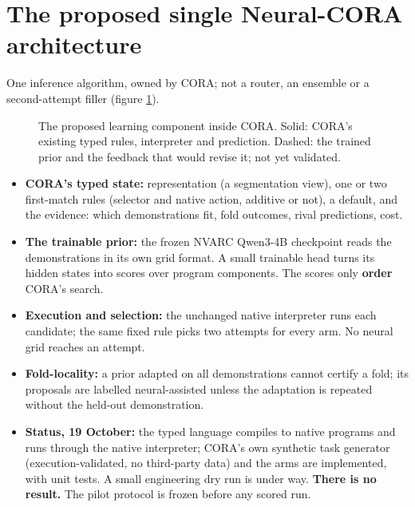 \documentclass[11pt, a4paper]{article}
\begin{document}
\section{The proposed single Neural-CORA architecture}
\label{sec-neural}
One inference algorithm, owned by CORA; not a router, an ensemble or a second-attempt filler (figure \ref{fig:neural}).

\begin{figure}[H]
\centering
{}
\caption{\label{fig:neural}The proposed learning component inside CORA. Solid: CORA's existing typed rules, interpreter and prediction. Dashed: the trained prior and the feedback that would revise it; not yet validated.}
\end{figure}

\begin{itemize}
\item \textbf{CORA's typed state:} representation (a segmentation view), one or two first-match rules (selector and native action,
additive or not), a default, and the evidence: which demonstrations fit, fold outcomes, rival predictions, cost.
\item \textbf{The trainable prior:} the frozen NVARC Qwen3-4B checkpoint reads the demonstrations in its own grid format. A small
trainable head turns its hidden states into scores over program components. The scores only \textbf{order} CORA's search.
\item \textbf{Execution and selection:} the unchanged native interpreter runs each candidate; the same fixed rule picks two
attempts for every arm. No neural grid reaches an attempt.
\item \textbf{Fold-locality:} a prior adapted on all demonstrations cannot certify a fold; its proposals are labelled
neural-assisted unless the adaptation is repeated without the held-out demonstration.
\item \textbf{Status, 19 October:} the typed language compiles to native programs and runs through the native interpreter; CORA's
own synthetic task generator (execution-validated, no third-party data) and the arms are implemented, with unit tests.
A small engineering dry run is under way. \textbf{There is no result.} The pilot protocol is frozen before any scored run.
\end{itemize}
\end{document}
